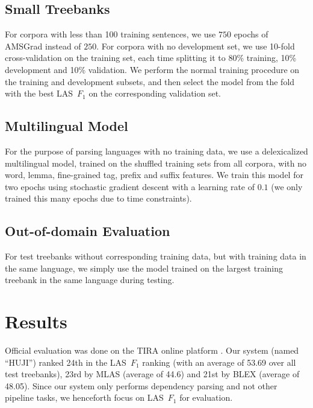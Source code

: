 \documentclass[11pt,a4paper]{article}
\begin{document}
\subsection{Small Treebanks}

For corpora with less than 100 training sentences,
we use $750$ epochs of AMSGrad instead of $250$.
For corpora with no development set,
we use 10-fold cross-validation on the training set,
each time splitting it to 80\% training, 10\% development and 10\% validation.
We perform the normal training procedure on the training and development
subsets, and then select the model from the fold with the best LAS~$F_1$
on the corresponding validation set.

\subsection{Multilingual Model}

For the purpose of parsing languages with no training data,
we use a delexicalized multilingual model, trained on the shuffled training sets
from all corpora, with no word, lemma, fine-grained tag, prefix and suffix features.
We train this model for two epochs using stochastic gradient descent
with a learning rate of $0.1$
(we only trained this many epochs due to time constraints).

\subsection{Out-of-domain Evaluation}

For test treebanks without corresponding training data,
but with training data in the same language,
we simply use the model trained on the largest training treebank in the same language
during testing.


\section{Results}\label{sec:results}

Official evaluation was done on the TIRA online platform \cite{tira}.
Our system (named ``HUJI'') ranked 24th in the LAS~$F_1$ ranking
(with an average of 53.69 over all test treebanks),
23rd by MLAS (average of 44.6) and 21st by BLEX (average of 48.05).
Since our system only performs dependency parsing and not other pipeline tasks,
we henceforth focus on LAS~$F_1$ \cite{nivre17udw} for evaluation.
\end{document}
